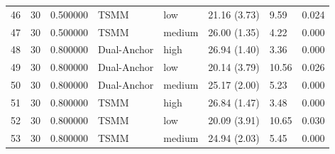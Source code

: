 \begin{tabular}{lrrlllll}
46 & 30 & 0.500000 & TSMM & low & 21.16 (3.73) & 9.59 & 0.024 \\
47 & 30 & 0.500000 & TSMM & medium & 26.00 (1.35) & 4.22 & 0.000 \\
48 & 30 & 0.800000 & Dual-Anchor & high & 26.94 (1.40) & 3.36 & 0.000 \\
49 & 30 & 0.800000 & Dual-Anchor & low & 20.14 (3.79) & 10.56 & 0.026 \\
50 & 30 & 0.800000 & Dual-Anchor & medium & 25.17 (2.00) & 5.23 & 0.000 \\
51 & 30 & 0.800000 & TSMM & high & 26.84 (1.47) & 3.48 & 0.000 \\
52 & 30 & 0.800000 & TSMM & low & 20.09 (3.91) & 10.65 & 0.030 \\
53 & 30 & 0.800000 & TSMM & medium & 24.94 (2.03) & 5.45 & 0.000 \\
\bottomrule
\end{tabular}

